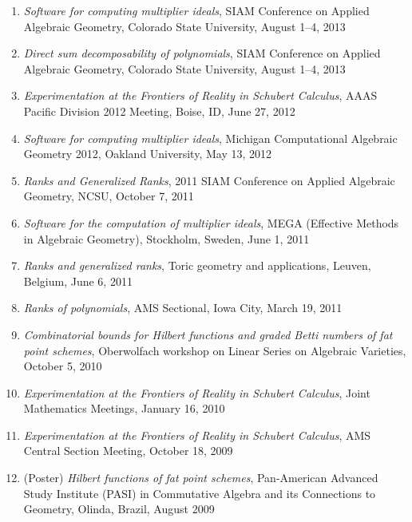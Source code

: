 \documentclass[12pt]{article}
\begin{document}
\begin{enumerate}[revarabic]
\item \textit{Software for computing multiplier ideals},
SIAM Conference on Applied Algebraic Geometry,
Colorado State University,
August 1--4, 2013

\item \textit{Direct sum decomposability of polynomials},
SIAM Conference on Applied Algebraic Geometry,
Colorado State University,
August 1--4, 2013

\item \textit{Experimentation at the Frontiers of Reality in Schubert Calculus},
AAAS Pacific Division 2012 Meeting,
Boise, ID, June 27, 2012

\item \textit{Software for computing multiplier ideals},
Michigan Computational Algebraic Geometry 2012,
Oakland University, May 13, 2012

\item \textit{Ranks and Generalized Ranks},
2011 SIAM Conference on Applied Algebraic Geometry,
NCSU, October 7, 2011

\item \textit{Software for the computation of multiplier ideals},
MEGA (Effective Methods in Algebraic Geometry), Stockholm, Sweden, June 1, 2011

\item \textit{Ranks and generalized ranks},
Toric geometry and applications, Leuven, Belgium, June 6, 2011

\item \textit{Ranks of polynomials}, AMS Sectional, Iowa City, March 19, 2011

\item \textit{Combinatorial bounds for Hilbert functions and graded Betti numbers of fat point schemes},
Oberwolfach workshop on Linear Series on Algebraic Varieties, October 5, 2010

\item \textit{Experimentation at the Frontiers of Reality in Schubert Calculus},
Joint Mathematics Meetings, January 16, 2010

\item \textit{Experimentation at the Frontiers of Reality in Schubert Calculus},
AMS Central Section Meeting, October 18, 2009

\item (Poster) \textit{Hilbert functions of fat point schemes},
Pan-American Advanced Study Institute (PASI) 
in 
Commutative Algebra and its Connections to Geometry,
Olinda, Brazil, August 2009


\end{enumerate}
\end{document}
